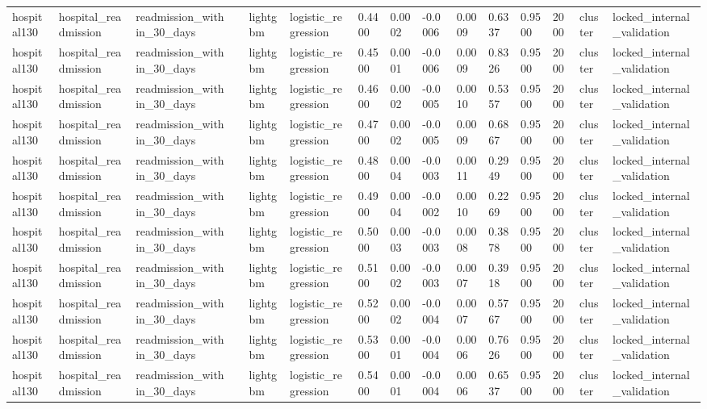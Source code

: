 \begin{tabular}{lllllllllllllll}
hospital130 & hospital\_readmission & readmission\_within\_30\_days &  & lightgbm & logistic\_regression & 0.4400 & 0.0002 & -0.0006 & 0.0009 & 0.6337 & 0.9500 & 2000 & cluster & locked\_internal\_validation \\
hospital130 & hospital\_readmission & readmission\_within\_30\_days &  & lightgbm & logistic\_regression & 0.4500 & 0.0001 & -0.0006 & 0.0009 & 0.8326 & 0.9500 & 2000 & cluster & locked\_internal\_validation \\
hospital130 & hospital\_readmission & readmission\_within\_30\_days &  & lightgbm & logistic\_regression & 0.4600 & 0.0002 & -0.0005 & 0.0010 & 0.5357 & 0.9500 & 2000 & cluster & locked\_internal\_validation \\
hospital130 & hospital\_readmission & readmission\_within\_30\_days &  & lightgbm & logistic\_regression & 0.4700 & 0.0002 & -0.0005 & 0.0009 & 0.6867 & 0.9500 & 2000 & cluster & locked\_internal\_validation \\
hospital130 & hospital\_readmission & readmission\_within\_30\_days &  & lightgbm & logistic\_regression & 0.4800 & 0.0004 & -0.0003 & 0.0011 & 0.2949 & 0.9500 & 2000 & cluster & locked\_internal\_validation \\
hospital130 & hospital\_readmission & readmission\_within\_30\_days &  & lightgbm & logistic\_regression & 0.4900 & 0.0004 & -0.0002 & 0.0010 & 0.2269 & 0.9500 & 2000 & cluster & locked\_internal\_validation \\
hospital130 & hospital\_readmission & readmission\_within\_30\_days &  & lightgbm & logistic\_regression & 0.5000 & 0.0003 & -0.0003 & 0.0008 & 0.3878 & 0.9500 & 2000 & cluster & locked\_internal\_validation \\
hospital130 & hospital\_readmission & readmission\_within\_30\_days &  & lightgbm & logistic\_regression & 0.5100 & 0.0002 & -0.0003 & 0.0007 & 0.3918 & 0.9500 & 2000 & cluster & locked\_internal\_validation \\
hospital130 & hospital\_readmission & readmission\_within\_30\_days &  & lightgbm & logistic\_regression & 0.5200 & 0.0002 & -0.0004 & 0.0007 & 0.5767 & 0.9500 & 2000 & cluster & locked\_internal\_validation \\
hospital130 & hospital\_readmission & readmission\_within\_30\_days &  & lightgbm & logistic\_regression & 0.5300 & 0.0001 & -0.0004 & 0.0006 & 0.7626 & 0.9500 & 2000 & cluster & locked\_internal\_validation \\
hospital130 & hospital\_readmission & readmission\_within\_30\_days &  & lightgbm & logistic\_regression & 0.5400 & 0.0001 & -0.0004 & 0.0006 & 0.6537 & 0.9500 & 2000 & cluster & locked\_internal\_validation \\

\end{tabular}
